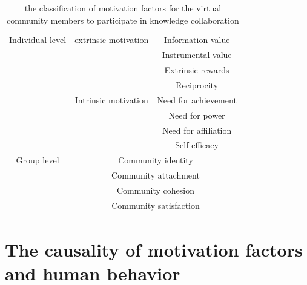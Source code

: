 \documentclass{elsarticle}
\begin{document}
\begin{table}[htpb]
  \label{tab:individual-level}
  \centering
   \caption{the classification of motivation factors for the virtual
    community members to participate in knowledge collaboration}
\begin{tabular}{ccc}
    \toprule
    \multicolumn{ 1}{c|}{Individual level} & \multicolumn{ 1}{|c|}{extrinsic motivation} & Information value \\
    \multicolumn{ 1}{c|}{} & \multicolumn{ 1}{|c|}{} & Instrumental value \\
    \multicolumn{ 1}{c|}{} & \multicolumn{ 1}{|c|}{} & Extrinsic rewards \\
    \multicolumn{ 1}{c|}{} & \multicolumn{ 1}{|c|}{} & Reciprocity \\\cline{2-3}
    \multicolumn{ 1}{c|}{} & \multicolumn{ 1}{|c|}{Intrinsic motivation} & Need for achievement \\
    \multicolumn{ 1}{c|}{} & \multicolumn{ 1}{|c|}{} & Need for power \\
    \multicolumn{ 1}{c|}{} & \multicolumn{ 1}{|c|}{} & Need for affiliation \\
    \multicolumn{ 1}{c|}{} & \multicolumn{ 1}{|c|}{} & Self-efficacy \\\hline
    \multicolumn{ 1}{c|}{Group level} & \multicolumn{ 2}{|c}{Community identity} \\
    \multicolumn{ 1}{c|}{} & \multicolumn{ 2}{|c}{Community attachment} \\
    \multicolumn{ 1}{c|}{} & \multicolumn{ 2}{|c}{Community cohesion} \\
    \multicolumn{ 1}{c|}{} & \multicolumn{ 2}{|c}{Community satisfaction} \\
    \bottomrule
    \end{tabular}
\end{table}

 

\section{The causality of motivation factors and human behavior}
\label{sec:modeling-process}
\end{document}
